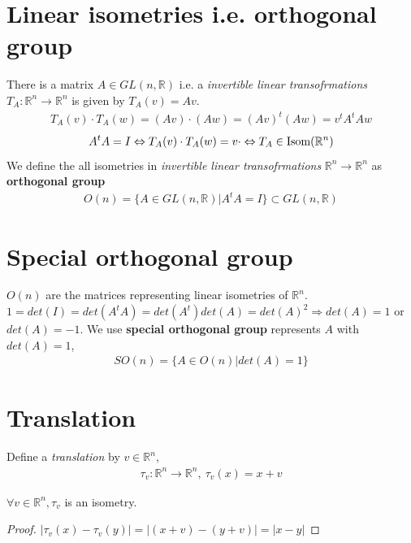 \documentclass[11pt]{elegantbook}
\begin{document}
\section{ Linear isometries i.e. orthogonal group}
There is a matrix $A\in GL(n,\mathbb{R})$ i.e. a \textit{invertible linear transofrmations} $T_A: \mathbb{R}^n \rightarrow \mathbb{R}^n$ is given by $T_A(v)=Av$.
\begin{equation}
    \begin{aligned}
        T_A(v)\cdot T_A(w)=(Av)\cdot(Aw)=(Av)^t(Aw)=v^tA^tAw
    \end{aligned}
    \nonumber
\end{equation}
\begin{equation}
    \begin{aligned}
        A^tA=I\Leftrightarrow T_A(v)\cdot T_A(w)=v\cdot \Leftrightarrow T_A\in \textnormal{Isom}(\mathbb{R}^n)
    \end{aligned}
    \nonumber
\end{equation}
We define the all isometries in \textit{invertible linear transofrmations} $\mathbb{R}^n \rightarrow \mathbb{R}^n$ as \textbf{orthogonal group}
\begin{equation}
    \begin{aligned}
        O(n)=\{A\in GL(n,\mathbb{R})|A^tA=I \}\subset GL(n,\mathbb{R})
    \end{aligned}
    \nonumber
\end{equation}

\section{Special orthogonal group}
$O(n)$ are the matrices representing linear isometries of $\mathbb{R}^n$.
$1=det(I)=det(A^tA)=det(A^t)det(A)=det(A)^2 \Rightarrow	det(A)=1$ or $det(A)=-1$. We use \textbf{special orthogonal group} represents $A$ with $det(A)=1$,
\begin{equation}
    \begin{aligned}
        SO(n)=\{A\in O(n) | det(A)=1\}
    \end{aligned}
    \nonumber
\end{equation}

\section{Translation}
Define a \textit{translation} by $v\in \mathbb{R}^n$,
\begin{equation}
    \begin{aligned}
        \tau_v:\mathbb{R}^n \rightarrow \mathbb{R}^n,\ \tau_v(x)=x+v
    \end{aligned}
    \nonumber
\end{equation}
\begin{note}[Exercise 2.5.3]
$\forall v\in \mathbb{R}^n, \tau_v$ is an isometry.
\end{note}
\begin{proof}
$|\tau_v(x)-\tau_v(y)|=|(x+v)-(y+v)|=|x-y|$
\end{proof}
\end{document}
